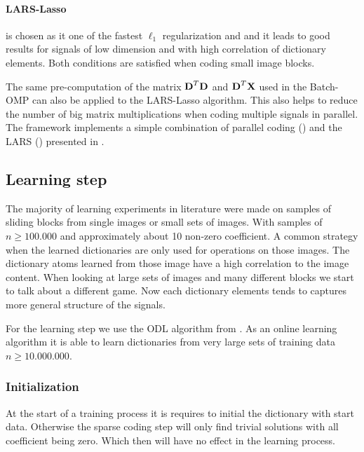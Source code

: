 
\paragraph{LARS-Lasso} is chosen as it one of the fastest $\ell_1$
regularization and and it leads to good results for signals of low dimension and
with high correlation of dictionary elements.\cite{Mairal2010} Both conditions
are satisfied when coding small image blocks.

The same pre-computation of the matrix $\boldsymbol{\mathrm{D}}^T\boldsymbol{\mathrm{D}}$ and
$\boldsymbol{\mathrm{D}}^T\boldsymbol{\mathrm{X}}$ used in the Batch-OMP can also be applied to the LARS-Lasso
algorithm. This also helps to reduce the number of big matrix multiplications
when coding multiple signals in parallel. The framework implements a simple
combination of parallel coding () and the
LARS () presented in .

\subsection{Learning step}
The majority of learning experiments in literature were made on
samples of sliding blocks from single images or small sets of images.
With samples of $n \ge 100.000$ and approximately about 10 non-zero coefficient.
A common strategy when the learned dictionaries are only used for operations on
those images. The dictionary atoms learned from those image have a high
correlation to the image content.  When looking at large sets of images and many
different blocks we start to talk about a different game. Now each dictionary
elements tends to captures more general structure of the signals.

For the learning step we use the ODL algorithm from . As
an online learning algorithm it is able to learn dictionaries from very large
sets of training data $n\ge 10.000.000$.


\subsubsection{Initialization}
At the start of a training process it is requires to initial the
dictionary with start data. Otherwise the sparse coding step will only find
trivial solutions with all coefficient being zero. Which then will have no
effect in the learning process.

